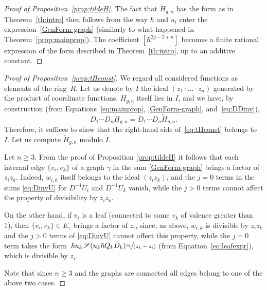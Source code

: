 \documentclass[JEP,XML,SOM,Unicode,NoEqCountersInSection,NoFloatCountersInSection]{cedram}
\let\mathcal\mathscr
\newcommand{\spfrac}[2]{\sfrac{#1}{(#2)}}
\theoremstyle{plain}
\theoremstyle{definition}
\theoremstyle{remark}
\newcommand{\cS}{\mathcal{S}}
\begin{document}
\begin{proof}[Proof of Proposition~\ref{prop:tildeH}]
The fact that $\widetilde H_{g,n}$ has the form as in Theorem~\ref{th:intro} then follows from the way $\hbar$ and $u_i$ enter the expression~\eqref{GenForm-graph} (similarly to what happened in Theorem~\ref{prop:mainprop}). The coefficient $[\hbar^{2g-2+n}]$ becomes a finite rational expression of the form described in Theorem~\ref{th:intro}, up to an additive constant.
\end{proof}

\begin{proof}[Proof of Proposition~\ref{prop:tHconst}]
We regard all considered functions as elements of the ring~$R$.
Let us denote by $I$ the ideal $(z_1\cdot\ldots\cdot z_n)$ generated by the product of coordinate functions.
$H_{g,n}$ itself lies in $I$, and we have, by construction (from Equations~\eqref{eq:mainprop}, \eqref{GenForm-graph}, and~\eqref{eq:DDinv}),
\begin{equation*}
D_1\cdots D_n H_{g,n}=D_1\cdots D_n \widetilde H_{g,n}.
\end{equation*}
Therefore, it suffices to show that the right-hand side of~\eqref{eq:tHconst} belongs to~$I$.
Let us compute $\widetilde{H}_{g,n}$ modulo $I$.

Let $n\geq 3$.
From the proof of Proposition \ref{prop:tildeH} it follows that each internal edge $\{v_i,v_k\}$ of a graph $\gamma$ in the sum \eqref{GenForm-graph} brings a factor of $z_i z_k$. Indeed, $w_{i,k}$ itself belongs to the ideal $(z_iz_k)$, and the $j=0$ terms in the sums \eqref{eq:DinvU} for $D^{-1}U_i$ and $D^{-1}U_k$ vanish, while the $j>0$ terms cannot affect the property of divisibility by $z_i z_k$.

On the other hand, if $v_i$ is a leaf (connected to some $v_k$ of valence greater than 1),
then $\{v_i,v_k\}\in E_\gamma$ brings a factor of $z_i$, since, as above, $w_{i,k}$ is divisible by $z_iz_k$ and the $j>0$ terms of \eqref{eq:DinvU} cannot affect this property, while the $j=0$ term takes the form~$\hbar u_k \cS(u_k\hbar Q_kD_k)\spfrac{z_i}{z_k-z_i}$ (from Equation~\eqref{eq:leafexpr}), which is divisible by $z_i$.

Note that since $n\geq 3$ and the graphs are connected all edges belong to one of the above two cases.


\end{proof}
\end{document}
